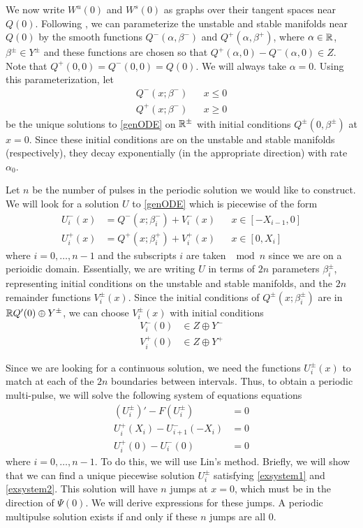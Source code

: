 \documentclass[thesis.tex]{subfiles}
\begin{document}
We now write $W^u(0)$ and $W^s(0)$ as graphs over their tangent spaces near $Q(0)$. Following \cite{Sandstede1997}, we can parameterize the unstable and stable manifolds near $Q(0)$ by the smooth functions $Q^-(\alpha, \beta^-)$ and $Q^+(\alpha, \beta^+)$, where $\alpha \in {\mathbb R}$, $\beta^\pm \in Y^\pm$ and these functions are chosen so that $Q^+(\alpha, 0) - Q^-(\alpha, 0) \in Z$. Note that $Q^+(0, 0) = Q^-(0, 0) = Q(0)$. We will always take $\alpha = 0$. Using this parameterization, let
\begin{align*}
Q^-(x; \beta^-) && x \leq 0 \\
Q^+(x; \beta^-) && x \geq 0
\end{align*}
be the unique solutions to \eqref{genODE} on ${\mathbb R}^\pm$ with initial conditions $Q^\pm(0, \beta^\pm)$ at $x = 0$. Since these initial conditions are on the unstable and stable manifolds (respectively), they decay exponentially (in the appropriate direction) with rate $\alpha_0$.

Let $n$ be the number of pulses in the periodic solution we would like to construct. We will look for a solution $U$ to \eqref{genODE} which is piecewise of the form
\begin{equation}\label{Upiecewise}
\begin{aligned}
U_i^-(x) &= Q^-(x; \beta_i^-) + V_i^-(x) && x \in [-X_{i-1}, 0] \\
U_i^+(x) &= Q^+(x; \beta_i^+) + V_i^+(x) && x \in [0, X_i]
\end{aligned}
\end{equation}
where $i = 0, \dots, n-1$ and the subscripts $i$ are taken $\mod n$ since we are on a perioidic domain. Essentially, we are writing $U$ in terms of $2n$ parameters $\beta_i^\pm$, representing initial conditions on the unstable and stable manifolds, and the $2n$ remainder functions $V_i^\pm(x)$. Since the initial conditions of $Q^\pm(x; \beta_i^\pm)$ are in ${\mathbb R} Q'(0) \oplus Y^\pm$, we can choose $V_i^\pm(x)$ with initial conditions
\begin{align*}
V_i^-(0) &\in Z \oplus Y^- \\
V_i^+(0) &\in Z \oplus Y^+
\end{align*}

Since we are looking for a continuous solution, we need the functions $U_i^\pm(x)$ to match at each of the $2n$ boundaries between intervals. Thus, to obtain a periodic multi-pulse, we will solve the following system of equations equations
\begin{align}
(U_i^\pm)' - F(U_i^\pm) &= 0 \label{exsystem1} \\
U_i^+(X_i) - U_{i+1}^-(-X_i) &= 0 \label{exsystem2} \\
U_i^+(0) - U_i^-(0) &= 0 \label{exsystem3}
\end{align}
where $i = 0, \dots, n-1$. To do this, we will use Lin's method. Briefly, we will show that we can find a unique piecewise solution $U_i^\pm$ satisfying \eqref{exsystem1} and \eqref{exsystem2}. This solution will have $n$ jumps at $x = 0$, which must be in the direction of $\Psi(0)$. We will derive expressions for these jumps. A periodic multipulse solution exists if and only if these $n$ jumps are all 0.
\end{document}
